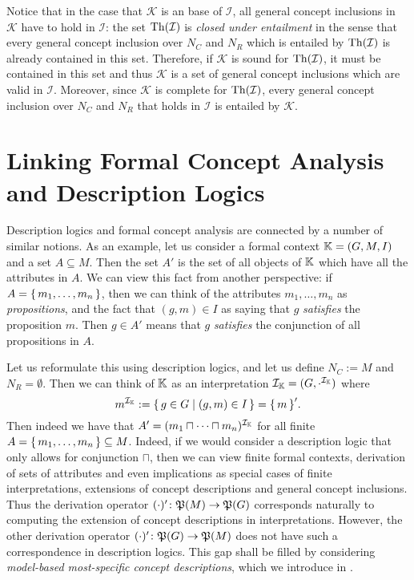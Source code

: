 Notice that in the case that $\mathcal{K}$ is an \ELbot base of $\mathcal{I}$, all general
concept inclusions in $\mathcal{K}$ have to hold in $\mathcal{I}$: the set
$\operatorname{Th}(\mathcal{I})$ is \emph{closed under entailment} in the sense that every \ELbot
general concept inclusion over $N_C$ and $N_R$ which is entailed by $\operatorname{Th}(\mathcal{I})$ is
already contained in this set.  Therefore, if $\mathcal{K}$ is sound for
$\operatorname{Th}(\mathcal{I})$, it must be contained in this set and thus $\mathcal{K}$ is a set of
general concept inclusions which are valid in $\mathcal{I}$.  Moreover, since
$\mathcal{K}$ is complete for $\operatorname{Th}(\mathcal{I})$, every general concept inclusion over
$N_C$ and $N_R$ that holds in $\mathcal{I}$ is entailed by $\mathcal{K}$.

\section{Linking Formal Concept Analysis and Description Logics}
\label{sec:motivation}

Description logics and formal concept analysis are connected by a number of similar
notions.  As an example, let us consider a formal context ${\mathbb{K}} = (G, M, I)$ and a set
$A \subseteq M$.  Then the set $A'$ is the set of all objects of ${\mathbb{K}}$ which have all
the attributes in $A$.  We can view this fact from another perspective: if $A = {\{\, m_1,
  \dots, m_n \,\}}$, then we can think of the attributes $m_1, \dots, m_n$ as
\emph{propositions}, and the fact that $(g, m) \in I$ as saying that $g$ \emph{satisfies}
the proposition $m$.  Then $g \in A'$ means that $g$ \emph{satisfies} the conjunction of
all propositions in $A$.

Let us reformulate this using description logics, and let us define $N_C := M$ and $N_R =
\emptyset$.  Then we can think of ${\mathbb{K}}$ as an interpretation $\mathcal{I}_{{\mathbb{K}}} =
(G, \cdot^{\mathcal{I}_{{\mathbb{K}}}})$ where
\begin{equation}
  \label{eq:17}
  m^{\mathcal{I}_{{\mathbb{K}}}} := {\{\, g \in G \mid (g, m) \in I \,\}} = {\{\, m \,\}}'.
\end{equation}
Then indeed we have that $A' = (m_1 \sqcap \dots \sqcap m_n)^{\mathcal{I}_{{\mathbb{K}}}}$ for
all finite $A = {\{\, m_1, \dots, m_n \,\}} \subseteq M$.  Indeed, if we would consider a
description logic that only allows for conjunction $\sqcap$, then we can view finite
formal contexts, derivation of sets of attributes and even implications as special cases
of finite interpretations, extensions of concept descriptions and general concept
inclusions.  Thus the derivation operator $(\cdot)' \colon {\ensuremath{\mathfrak{P}(M)}} \to {\ensuremath{\mathfrak{P}(G)}}$
corresponds naturally to computing the extension of concept descriptions in
interpretations.  However, the other derivation operator $(\cdot)' \colon {\ensuremath{\mathfrak{P}(G)}} \to
{\ensuremath{\mathfrak{P}(M)}}$ does not have such a correspondence in description logics.  This gap shall be
filled by considering \emph{model-based most-specific concept descriptions}, which we
introduce in .

